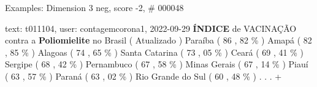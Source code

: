 \begin{frame}{Examples: Dimension 3 neg, score -2, \# 000048}
\footnotesize
\begin{alertblock}{text: t011104, user: contagemcorona1, 2022-09-29}
 \textbf{ÍNDICE} de VACINAÇÃO contra a \textbf{Poliomielite} no 
Brasil ( Atualizado ) Paraíba ( 86 , 82 \% ) Amapá ( 82 , 85 \% ) Alagoas ( 74 
, 65 \% ) Santa Catarina ( 73 , 05 \% ) Ceará ( 69 , 41 \% ) Sergipe ( 68 , 42 
\% ) Pernambuco ( 67 , 58 \% ) Minas Gerais ( 67 , 14 \% ) Piauí ( 63 , 57 \% ) 
Paraná ( 63 , 02 \% ) Rio Grande do Sul ( 60 , 48 \% ) . . . + 
\end{alertblock}
\end{frame}
